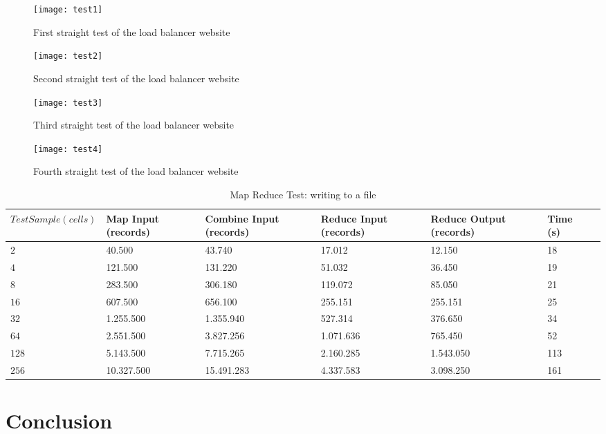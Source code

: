 \documentclass{article}
\begin{document}
\begin{figure}[H]
      \centering
      \texttt{[image: test1]}
      \caption{First straight test of the load balancer website}
      \label{load_balancer_test1}
\end{figure}
\begin{figure}[H]
      \centering
      \texttt{[image: test2]}
      \caption{Second straight test of the load balancer website}
      \label{load_balancer_test2}
\end{figure}
\begin{figure}[H]
      \centering
      \texttt{[image: test3]}
      \caption{Third straight test of the load balancer website}
      \label{load_balancer_test3}
\end{figure}
\begin{figure}[H]
      \centering
      \texttt{[image: test4]}
      \caption{Fourth straight test of the load balancer website}
      \label{load_balancer_test4}
\end{figure}
\begin{table}[htbp!]
\begin{center}
\caption{Map Reduce Test: writing to a file}
\begin{tabular}{*{7}{|l}|}
\hline
 $Test Sample (cells)$ & Map Input (records) & Combine Input (records) & Reduce Input (records) & Reduce Output (records) & Time (s) \\ \hline
$2$ & 40.500 & 43.740 & 17.012 & 12.150 & 18 \\ \hline
$4$ & 121.500 & 131.220 & 51.032 & 36.450 & 19 \\ \hline
$8$ & 283.500 & 306.180 & 119.072 & 85.050 & 21 \\ \hline
$16$ & 607.500 & 656.100 & 255.151 & 255.151 & 25 \\ \hline
$32$ & 1.255.500 & 1.355.940 & 527.314 & 376.650 & 34 \\ \hline
$64$ & 2.551.500 & 3.827.256 & 1.071.636 & 765.450 & 52 \\ \hline
$128$ & 5.143.500 & 7.715.265 & 2.160.285 & 1.543.050 & 113 \\ \hline
$256$ & 10.327.500 & 15.491.283 & 4.337.583 & 3.098.250 & 161 \\ \hline
\end{tabular}
\end{center}
\label{map_reduce_test}
\end{table}
\section{Conclusion}
\end{document}
